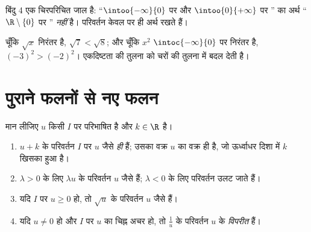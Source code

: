 \begin{remark}
बिंदु 4 एक चिरपरिचित जाल है: ``$\intoo{-\infty}{0}$ पर और $\intoo{0}{+\infty}$ पर '' का अर्थ
``$\R \setminus \{0\}$ पर '' \emph{नहीं} है। परिवर्तन केवल  पर ही अर्थ
रखते हैं।
\end{remark}

\begin{example}[बिना गणना किए तुलना]
चूँकि $\sqrt x$ निरंतर  है, $\sqrt{7} < \sqrt{8}$; और चूँकि $x^2$ $\intoc{-\infty}{0}$ पर निरंतर 
है, $(-3)^2 > (-2)^2$। एकदिष्टता  की तुलना को चरों की तुलना में बदल देती है।
\end{example}

\section{पुराने फलनों से नए फलन}

\begin{proposition}[रूपांतरण]\label{prop:g11:func:transforms}
मान लीजिए $u$ किसी  $I$ पर परिभाषित  है और $k \in \R$ है।
\begin{enumerate}
  \item $u + k$ के परिवर्तन $I$ पर $u$ जैसे \emph{ही} हैं; उसका वक्र $u$
        का वक्र ही है, जो ऊर्ध्वाधर दिशा में $k$ खिसका हुआ है।
  \item $\lambda > 0$ के लिए $\lambda u$ के परिवर्तन $u$ जैसे हैं; $\lambda < 0$ के लिए
        परिवर्तन उलट जाते हैं।
  \item यदि $I$ पर $u \geq 0$ हो, तो $\sqrt u$ के परिवर्तन $u$ जैसे हैं।
  \item यदि $u \neq 0$ हो और $I$ पर $u$ का चिह्न अचर हो, तो $\frac1u$ के
        परिवर्तन $u$ के \emph{विपरीत} हैं।
\end{enumerate}
\end{proposition}

